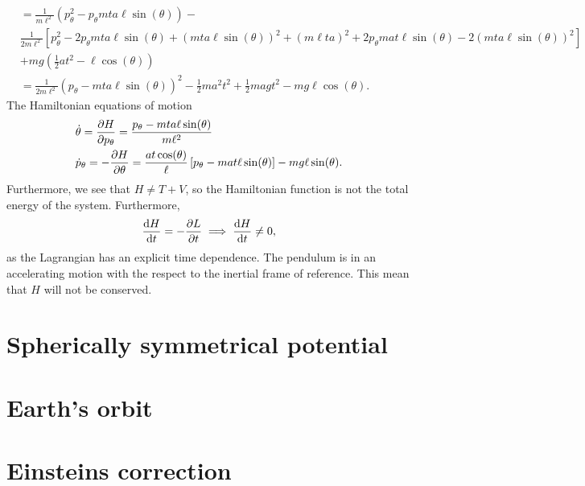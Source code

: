 \documentclass{article}
\begin{document}
        \begin{align*}
            & = \frac{1}{m \ell^2} \left(p_\theta^2 - p_\theta m t a \ell \sin(\theta)\right) - \\
            & \frac{1}{2 m \ell^2} \left[ p_\theta^2 - 2 p_\theta mta\ell \sin(\theta) + (mta\ell \sin(\theta))^2 + (m\ell ta)^2 + 2 p_\theta m a t \ell \sin(\theta) - 2 (m t a \ell \sin(\theta))^2 \right] \\
            & +  mg \left(\frac{1}{2}a t^2 - \ell \cos(\theta)\right) \\
            & = \frac{1}{2 m \ell^2} \left(p_\theta - m t a \ell \sin(\theta)\right)^2 - \frac{1}{2} m a^2 t^2 + \frac{1}{2}m a g t^2 - mg \ell \cos(\theta).
        \end{align*}
        The Hamiltonian equations of motion
        \begin{align*}
            & \dot \theta = \pdv{H}{p_\theta} = \frac{p_\theta - m t a \ell\sin(\theta)}{m \ell^2} \\
            & \dot p_\theta = - \pdv{H}{\theta} = \frac{a t \cos(\theta)}{\ell} \left[ p_\theta - m a t \ell \sin(\theta) \right] - m g \ell \sin(\theta).
        \end{align*}
        Furthermore, we see that $H \neq T + V$, so the Hamiltonian function is not the total energy of the system. Furthermore, 
        \begin{equation*}
            \dv{H}{t} = - \pdv{L}{t} \implies \dv{H}{t} \neq 0,
        \end{equation*}
        as the Lagrangian has an explicit time dependence. The pendulum is in an accelerating motion with the respect to the inertial frame of reference. This mean that $H$ will not be conserved.

    \section{Spherically symmetrical potential}

    \section{Earth's orbit}

    \section{Einsteins correction}
\end{document}
